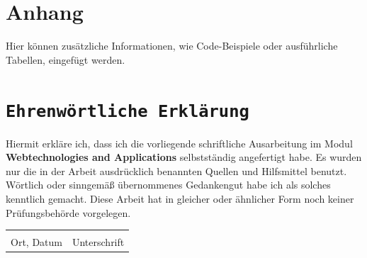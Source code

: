 \documentclass[a4paper,12pt]{article}
\begin{document}
\newpage
\appendix
\section{Anhang}
Hier können zusätzliche Informationen, wie Code-Beispiele oder ausführliche Tabellen, eingefügt werden.

\newpage
{}
\section*{\texttt{Ehrenwörtliche Erklärung}}
Hiermit erkläre ich, dass ich die vorliegende schriftliche Ausarbeitung im Modul \textbf{Webtechnologies and Applications} selbstständig
angefertigt habe. Es wurden nur die in der Arbeit ausdrücklich benannten Quellen und
Hilfsmittel benutzt. Wörtlich oder sinngemäß übernommenes Gedankengut habe ich als
solches kenntlich gemacht. Diese Arbeit hat in gleicher oder ähnlicher Form noch keiner
Prüfungsbehörde vorgelegen.

\vspace{3cm}
\noindent\begin{tabular}{p{}p{}}
    \hrulefill & \hrulefill \\
    Ort, Datum & Unterschrift \\
\end{tabular}
\end{document}
